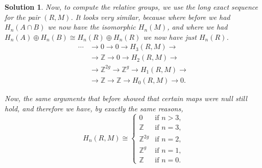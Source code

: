 \documentclass{article}
\theoremstyle{plain}
\theoremstyle{nonumberplain}
\newtheorem{sol}{Solution}
\newcommand{\Z}{\mathbb{Z}}
\begin{document}
\begin{sol}
\medskip

Now, to compute the relative groups, we use the long exact sequence for the pair $(R,M)$. It looks very similar, because where before we had $H_n(A \cap B)$ we now have the isomorphic $H_n(M)$, and where we had $H_n(A) \oplus H_n(B) \cong H_n(R) \oplus H_n(R)$ we now have just $H_n(R)$.
\begin{equation}
\begin{aligned}
\cdots &\to 0 \to 0 \to H_3(R,M) \to \\
&\to \Z \to 0 \to H_2(R,M) \to\\
&\to \Z^{2g} \to \Z^{g} \to H_1(R,M) \to\\
&\to \Z \to \Z \to H_0(R,M) \to 0.
\end{aligned}
\end{equation}

Now, the same arguments that before showed that certain maps were null still hold, and therefore we have, by exactly the same reasons,
\begin{equation}
H_n(R,M) \cong \begin{cases}
0 & \text{if $n > 3$,}\\
\Z & \text{if $n = 3$,}\\
\Z^{2g} & \text{if $n = 2$,}\\
\Z^{g} & \text{if $n = 1$,}\\
\Z & \text{if $n = 0$.}
\end{cases}
\end{equation}
\end{sol}
\end{document}
